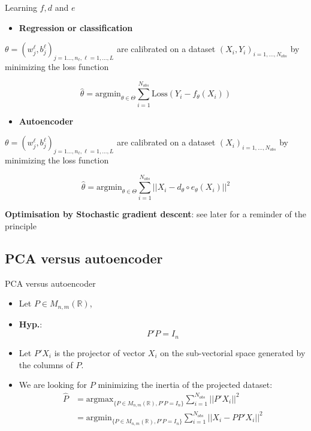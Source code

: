 \documentclass[compress,10pt]{beamer}
\begin{document}
\begin{frame}{Learning \(f,d\) and \(e\)}

\begin{itemize}
\item
  \textbf{Regression or classification}
\end{itemize}

\(\theta = (w^\ell_j,b^\ell_j)_{j = 1\dots,n_\ell, \ell = 1,\dots,L}\)
are calibrated on a dataset \((X_i,Y_i)_{i=1, \dots , N_{obs}}\) by
minimizing the loss function

\[\widehat{\theta} = \mbox{argmin}_{\theta \in\Theta}  \sum_{i=1}^{N_{obs}}\mbox{Loss}(Y_i - f_{\theta}(X_i))\]

\begin{itemize}

\item  \textbf{Autoencoder}
\end{itemize}

\(\theta = (w^\ell_j,b^\ell_j)_{j = 1\dots,n_\ell, \ell = 1,\dots,L}\)
are calibrated on a dataset \((X_i)_{i=1, \dots , N_{obs}}\) by
minimizing the loss function

\[\widehat{\theta} = \mbox{argmin}_{\theta \in\Theta}  \sum_{i=1}^{N_{obs}}||X_i - d_{\theta}\circ e_{\theta}(X_i)||^2\]

\textbf{Optimisation by Stochastic gradient descent}: see later for a
reminder of the principle
\end{frame}


\subsection{PCA versus autoencoder}
\begin{frame}{PCA versus autoencoder}
\protect\hypertarget{pca-versus-autoencoder}{}
\begin{itemize}
\item
  Let \(P \in M_{n,m}(\mathbb{R})\),%
\item
  \textbf{Hyp.}: %
  \[P'P = I_n\]
\item
  Let \(P' X_i\) is the projector of vector \(X_i\) on the sub-vectorial
  space generated by the columns of \(P\).
\item
  We are looking for \(P\) minimizing the inertia of the projected
  dataset: \[
  \begin{aligned}
  \widehat{P} &=\mbox{argmax}_{\{P\in M_{n,m}(\mathbb{R}), P'P = I_n\}} \sum_{i=1}^{N_{obs}} || P'X_i||^2\\ &=\mbox{argmin}_{\{P \in M_{n,m}(\mathbb{R}), P'P = I_n\}} \sum_{i=1}^{N_{obs}} || X_i - PP'X_i||^2
  \end{aligned}
  \]
\end{itemize}
\end{frame}
\end{document}
